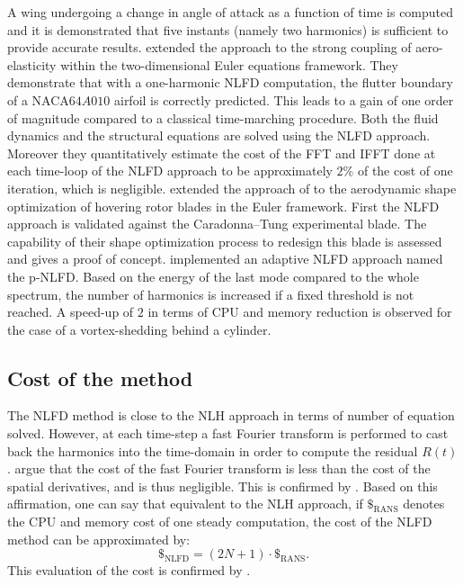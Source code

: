 A wing undergoing a change 
in angle of attack as a function of time is computed and
it is demonstrated that
five instants (namely two harmonics) is sufficient to provide
accurate results.
\citet{Kachra2008} extended the approach to the strong coupling of
aero-elasticity within the two-dimensional Euler equations framework.
They demonstrate that with a one-harmonic NLFD computation, the
flutter boundary of a NACA$64A010$ airfoil is correctly predicted.
This leads to a gain of one order of magnitude compared to a classical
time-marching procedure. Both the fluid dynamics and the structural equations
are solved using the NLFD approach. Moreover they quantitatively estimate the
cost of the FFT and IFFT done at each time-loop of the NLFD approach to be
approximately $2\%$ of the cost of one iteration, which is negligible.
\citet{Tatossian2011} extended the approach of \citet{Nadarajah2007}
to the aerodynamic shape optimization of hovering rotor blades
in the Euler framework.
First the NLFD approach is validated
against the Caradonna–Tung experimental blade.
The capability of 
their shape optimization process
to redesign this blade is assessed and gives a proof
of concept.
\citet{Mosahebi2013} implemented an adaptive NLFD approach named
the p-NLFD. Based on the energy of the last mode compared
to the whole spectrum, the number of harmonics
is increased if a fixed threshold is not reached.
A speed-up of $2$ in terms of CPU and
memory reduction is observed for the case of a
vortex-shedding behind a cylinder.




\subsection{Cost of the method}
The NLFD method is close to the NLH approach in terms of number
of equation solved. However, at each time-step a fast Fourier transform
is performed to cast back the harmonics into the time-domain in order
to compute the residual $R(t)$. \citet{McMullen2006} argue
that the cost of the fast Fourier transform is less than the cost of 
the spatial derivatives, and is thus negligible. This is 
confirmed by \citet{Kachra2008}.
Based on this affirmation, one can say that equivalent to the NLH
approach, if $\mathdollar_{\text{RANS}}$ 
denotes the CPU and memory cost of
one steady computation, the cost of the NLFD method can be 
approximated by:
\begin{equation}
	\mathdollar_{\text{NLFD}} = (2N+1) \cdot \mathdollar_{\text{RANS}}.
\end{equation}
This evaluation of the cost is confirmed by \citet{McMullen2002}.